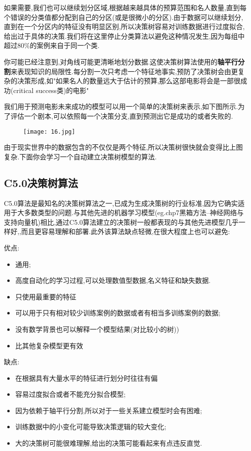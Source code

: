 \documentclass[11pt,a4paper,oneside]{book}
\begin{document}
如果需要,我们也可以继续划分区域,根据越来越具体的预算范围和名人数量,直到每个错误的分类值都分配到自己的分区(或是很微小的分区).由于数据可以继续划分,直到在一个分区内的特征没有明显区别,所以决策树容易对训练数据进行过度拟合,给出过于具体的决策.我们将在这里停止分类算法以避免这种情况发生,因为每组中超过80\%的案例来自于同一个类.

\begin{tcolorbox}[colback=pink!10!white,colframe=pink!100!black]
你可能已经注意到,对角线可能更清晰地划分数据.这使决策树算法使用的\textbf{轴平行分割}来表现知识的局限性.每分割一次只考虑一个特征地事实,预防了决策树会由更复杂的决策形成,如"如果名人的数量远大于估计的预算,那么这部电影将会是一部很成功(critical success类)的电影"
\end{tcolorbox}

我们用于预测电影未来成功的模型可以用一个简单的决策树来表示,如下图所示.为了评估一个剧本,可以依照每一个决策分支,直到预测出它是成功的或者失败的.
\begin{figure}[H]
	\centering
	\texttt{[image: 16.jpg]}
\end{figure}

由于现实世界中的数据包含的不仅仅是两个特征,所以决策树很快就会变得比上图复杂.下面你会学习一个自动建立决策树模型的算法.

\subsection{C5.0决策树算法}
C5.0算法是最知名的决策树算法之一,已成为生成决策树的行业标准,因为它确实适用于大多数类型的问题.与其他先进的机器学习模型(eg.chp7黑箱方法--神经网络与支持向量机)相比,通过C5.0算法建立的决策树一般都表现的与其他先进模型几乎一样好,,而且更容易理解和部署.此外该算法缺点轻微,在很大程度上也可以避免:

\begin{tcolorbox}[colback=pink!10!white,colframe=pink!100!black]
优点:
\begin{itemize}
	\item 通用;
	\item 高度自动化的学习过程,可以处理数值型数据,名义特征和缺失数据.
	\item 只使用最重要的特征
	\item 可以用于只有相对较少训练案例的数据或者有相当多训练案例的数据;
	\item 没有数学背景也可以解释一个模型结果(对比较小的树))
	\item 比其他复杂模型更有效
\end{itemize}

缺点:
\begin{itemize}
	\item 在根据具有大量水平的特征进行划分时往往有偏
	\item 容易过度拟合或者不能充分拟合模型;
	\item 因为依赖于轴平行分割,所以对于一些关系建立模型时会有困难;
	\item 训练数据中的小变化可能导致决策逻辑的较大变化;
	\item 大的决策树可能很难理解,给出的决策可能看起来有点违反直觉.
\end{itemize}
\end{tcolorbox}
\end{document}
